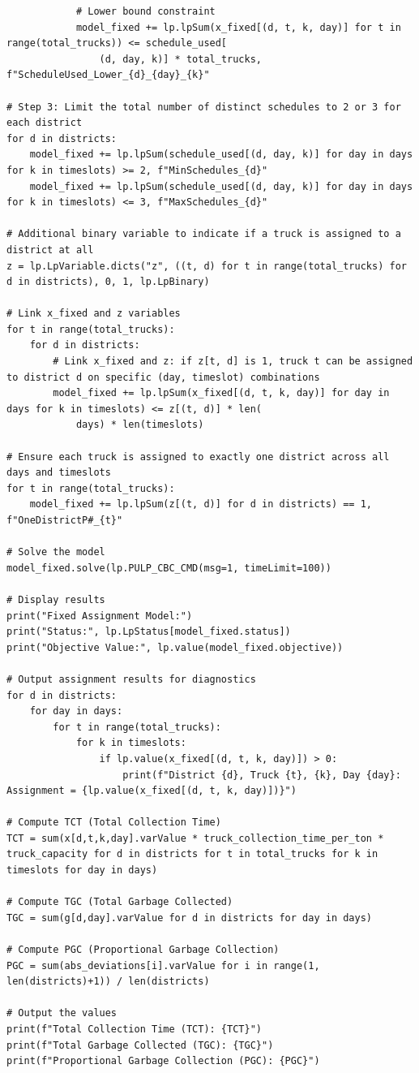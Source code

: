 \documentclass{article}
\begin{document}
\begin{verbatim}
            # Lower bound constraint
            model_fixed += lp.lpSum(x_fixed[(d, t, k, day)] for t in range(total_trucks)) <= schedule_used[
                (d, day, k)] * total_trucks, f"ScheduleUsed_Lower_{d}_{day}_{k}"

# Step 3: Limit the total number of distinct schedules to 2 or 3 for each district
for d in districts:
    model_fixed += lp.lpSum(schedule_used[(d, day, k)] for day in days for k in timeslots) >= 2, f"MinSchedules_{d}"
    model_fixed += lp.lpSum(schedule_used[(d, day, k)] for day in days for k in timeslots) <= 3, f"MaxSchedules_{d}"

# Additional binary variable to indicate if a truck is assigned to a district at all
z = lp.LpVariable.dicts("z", ((t, d) for t in range(total_trucks) for d in districts), 0, 1, lp.LpBinary)

# Link x_fixed and z variables
for t in range(total_trucks):
    for d in districts:
        # Link x_fixed and z: if z[t, d] is 1, truck t can be assigned to district d on specific (day, timeslot) combinations
        model_fixed += lp.lpSum(x_fixed[(d, t, k, day)] for day in days for k in timeslots) <= z[(t, d)] * len(
            days) * len(timeslots)

# Ensure each truck is assigned to exactly one district across all days and timeslots
for t in range(total_trucks):
    model_fixed += lp.lpSum(z[(t, d)] for d in districts) == 1, f"OneDistrictP#_{t}"

# Solve the model
model_fixed.solve(lp.PULP_CBC_CMD(msg=1, timeLimit=100))

# Display results
print("Fixed Assignment Model:")
print("Status:", lp.LpStatus[model_fixed.status])
print("Objective Value:", lp.value(model_fixed.objective))

# Output assignment results for diagnostics
for d in districts:
    for day in days:
        for t in range(total_trucks):
            for k in timeslots:
                if lp.value(x_fixed[(d, t, k, day)]) > 0:
                    print(f"District {d}, Truck {t}, {k}, Day {day}: Assignment = {lp.value(x_fixed[(d, t, k, day)])}")

# Compute TCT (Total Collection Time)
TCT = sum(x[d,t,k,day].varValue * truck_collection_time_per_ton * truck_capacity for d in districts for t in total_trucks for k in timeslots for day in days)

# Compute TGC (Total Garbage Collected)
TGC = sum(g[d,day].varValue for d in districts for day in days)

# Compute PGC (Proportional Garbage Collection)
PGC = sum(abs_deviations[i].varValue for i in range(1, len(districts)+1)) / len(districts)

# Output the values
print(f"Total Collection Time (TCT): {TCT}")
print(f"Total Garbage Collected (TGC): {TGC}")
print(f"Proportional Garbage Collection (PGC): {PGC}")

\end{verbatim}
\end{document}
